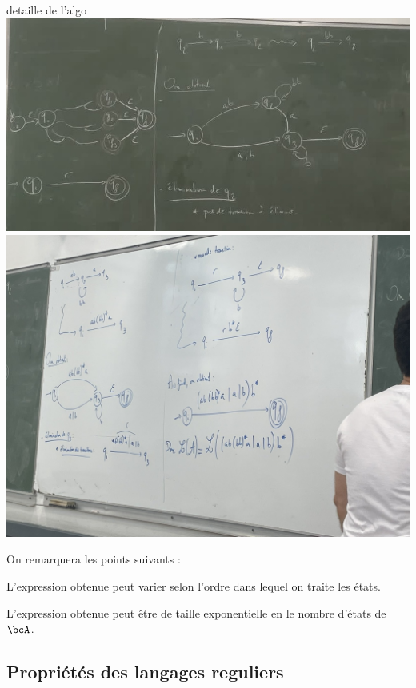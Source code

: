 \begin{example}{detaille de l'algo }{}
        \vspace{2cm}
        \includegraphics[scale=0.2]{Dessin/Tableau3.jpeg}
        \vspace{2cm}
        \includegraphics[scale=0.2]{Dessin/Tableau4.jpeg}
        
        
    \end{example}
    
    On remarquera les points suivants :
    \begin{enumerate}
        \itt L'expression obtenue peut varier selon l'ordre dans lequel on traite les états.
        
        \itt L'expression obtenue peut être de taille exponentielle en le nombre d'états de $\bcA$.
    \end{enumerate}
    
    \subsection{Propriétés des langages reguliers}
    
